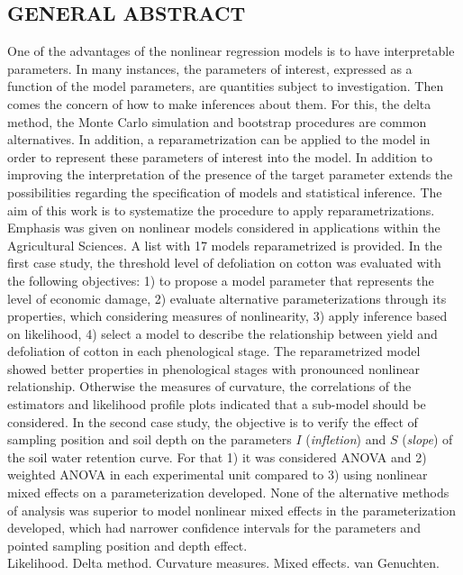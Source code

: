 
\newpage
\begin{singlespace}
\begin{center}
\section*{GENERAL ABSTRACT}
\end{center}

One of the advantages of the nonlinear regression models is to have
interpretable parameters. In many instances, the parameters of
interest, expressed as a function of the model parameters, are
quantities subject to investigation. Then comes the concern of how to
make inferences about them. For this, the delta method, the Monte
Carlo simulation and bootstrap procedures are common alternatives. In
addition, a reparametrization can be applied to the model in order to
represent these parameters of interest into the model. In addition to
improving the interpretation of the presence of the target parameter
extends the possibilities regarding the specification of models and
statistical inference. The aim of this work is to systematize the
procedure to apply reparametrizations. Emphasis was given on nonlinear
models considered in applications within the Agricultural Sciences. A
list with 17 models reparametrized is provided. In the first case
study, the threshold level of defoliation on cotton was evaluated with
the following objectives: 1) to propose a model parameter that
represents the level of economic damage, 2) evaluate alternative
parameterizations through its properties, which considering measures
of nonlinearity, 3) apply inference based on likelihood, 4) select a
model to describe the relationship between yield and defoliation of
cotton in each phenological stage. The reparametrized model showed
better properties in phenological stages with pronounced nonlinear
relationship. Otherwise the measures of curvature, the correlations of
the estimators and likelihood profile plots indicated that a sub-model
should be considered. In the second case study, the objective is to
verify the effect of sampling position and soil depth on the
parameters $I$ (\emph{infletion}) and $S$ (\emph{slope}) of the soil
water retention curve. For that 1) it was considered ANOVA and 2)
weighted ANOVA in each experimental unit compared to 3) using
nonlinear mixed effects on a parameterization developed. None of the
alternative methods of analysis was superior to model nonlinear mixed
effects in the parameterization developed, which had narrower
confidence intervals for the parameters and pointed sampling position
and depth effect.\\
\newline
{} Likelihood. Delta method. Curvature measures. Mixed
effects. van Genuchten.

\end{singlespace}
